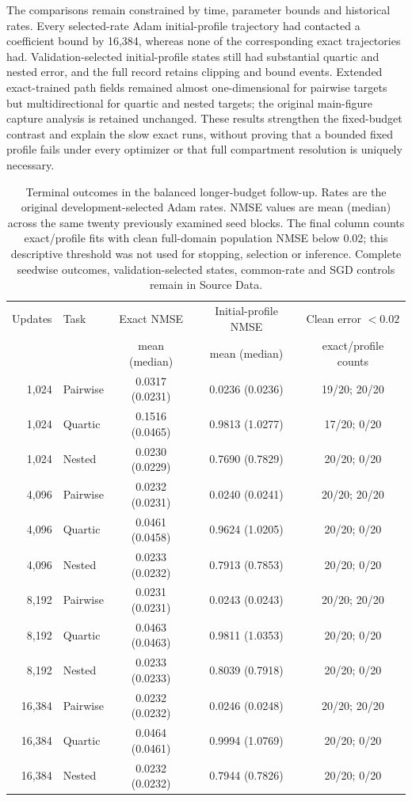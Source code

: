 The comparisons remain constrained by time, parameter bounds and historical rates. Every selected-rate Adam initial-profile trajectory had contacted a coefficient bound by 16,384, whereas none of the corresponding exact trajectories had. Validation-selected initial-profile states still had substantial quartic and nested error, and the full record retains clipping and bound events. Extended exact-trained path fields remained almost one-dimensional for pairwise targets but multidirectional for quartic and nested targets; the original main-figure capture analysis is retained unchanged. These results strengthen the fixed-budget contrast and explain the slow exact runs, without proving that a bounded fixed profile fails under every optimizer or that full compartment resolution is uniquely necessary.

\begin{table}[tbp]
\centering
\small
\caption{Terminal outcomes in the balanced longer-budget follow-up. Rates are the original development-selected Adam rates. NMSE values are mean (median) across the same twenty previously examined seed blocks. The final column counts exact/profile fits with clean full-domain population NMSE below 0.02; this descriptive threshold was not used for stopping, selection or inference. Complete seedwise outcomes, validation-selected states, common-rate and SGD controls remain in Source Data.}
\label{tab:credit_rule_extension_endpoints}
\begin{tabular}{rlccc}
\toprule
Updates & Task & Exact NMSE & Initial-profile NMSE & Clean error $<0.02$ \\
 & & mean (median) & mean (median) & exact/profile counts \\
\midrule
1,024 & Pairwise & 0.0317 (0.0231) & 0.0236 (0.0236) & 19/20; 20/20 \\
1,024 & Quartic & 0.1516 (0.0465) & 0.9813 (1.0277) & 17/20; 0/20 \\
1,024 & Nested & 0.0230 (0.0229) & 0.7690 (0.7829) & 20/20; 0/20 \\
4,096 & Pairwise & 0.0232 (0.0231) & 0.0240 (0.0241) & 20/20; 20/20 \\
4,096 & Quartic & 0.0461 (0.0458) & 0.9624 (1.0205) & 20/20; 0/20 \\
4,096 & Nested & 0.0233 (0.0232) & 0.7913 (0.7853) & 20/20; 0/20 \\
8,192 & Pairwise & 0.0231 (0.0231) & 0.0243 (0.0243) & 20/20; 20/20 \\
8,192 & Quartic & 0.0463 (0.0463) & 0.9811 (1.0353) & 20/20; 0/20 \\
8,192 & Nested & 0.0233 (0.0233) & 0.8039 (0.7918) & 20/20; 0/20 \\
16,384 & Pairwise & 0.0232 (0.0232) & 0.0246 (0.0248) & 20/20; 20/20 \\
16,384 & Quartic & 0.0464 (0.0461) & 0.9994 (1.0769) & 20/20; 0/20 \\
16,384 & Nested & 0.0232 (0.0232) & 0.7944 (0.7826) & 20/20; 0/20 \\
\bottomrule
\end{tabular}
\end{table}

